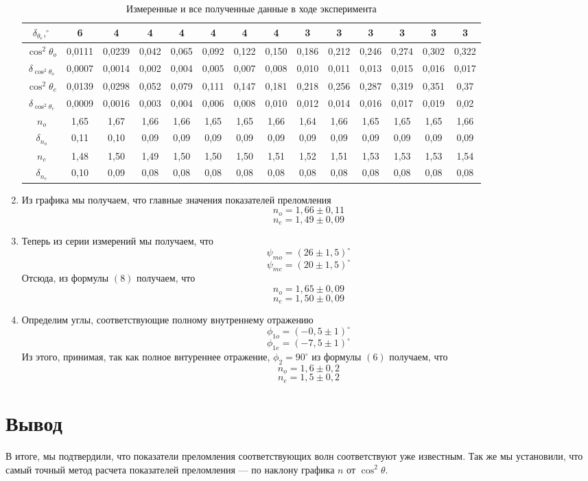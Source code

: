 \documentclass[a4paper, 12pt]{article}%
\begin{document}
\begin{enumerate}
\begin{table}[]
\begin{center}
{\begin{tabular}{|c|c|c|c|c|c|c|c|c|c|c|c|c|c|}
$\delta_{\theta_e}, ^{\circ}$  & 6      & 4      & 4     & 4     & 4     & 4     & 4     & 3     & 3     & 3     & 3     & 3     & 3     \\ \hline
$\cos^2\theta_o$               & 0,0111 & 0,0239 & 0,042 & 0,065 & 0,092 & 0,122 & 0,150 & 0,186 & 0,212 & 0,246 & 0,274 & 0,302 & 0,322 \\ \hline
$\delta_{\cos^2\theta_o}$      & 0,0007 & 0,0014 & 0,002 & 0,004 & 0,005 & 0,007 & 0,008 & 0,010 & 0,011 & 0,013 & 0,015 & 0,016 & 0,017 \\ \hline
$\cos^2\theta_e$               & 0,0139 & 0,0298 & 0,052 & 0,079 & 0,111 & 0,147 & 0,181 & 0,218 & 0,256 & 0,287 & 0,319 & 0,351 & 0,37  \\ \hline
$\delta_{\cos^2\theta_e}$      & 0,0009 & 0,0016 & 0,003 & 0,004 & 0,006 & 0,008 & 0,010 & 0,012 & 0,014 & 0,016 & 0,017 & 0,019 & 0,02  \\ \hline
$n_o$                          & 1,65   & 1,67   & 1,66  & 1,66  & 1,65  & 1,65  & 1,66  & 1,64  & 1,66  & 1,65  & 1,65  & 1,65  & 1,66  \\ \hline
$\delta_{n_o}$                 & 0,11   & 0,10   & 0,09  & 0,09  & 0,09  & 0,09  & 0,09  & 0,09  & 0,09  & 0,09  & 0,09  & 0,09  & 0,09  \\ \hline
$n_e$                          & 1,48   & 1,50   & 1,49  & 1,50  & 1,50  & 1,50  & 1,51  & 1,52  & 1,51  & 1,53  & 1,53  & 1,53  & 1,54  \\ \hline
$\delta_{n_e}$                 & 0,10   & 0,09   & 0,08  & 0,08  & 0,08  & 0,08  & 0,08  & 0,08  & 0,08  & 0,08  & 0,08  & 0,08  & 0,08  \\ \hline
\end{tabular}}
\end{center}
\caption{Измеренные и все полученные данные в ходе эксперимента}
\end{table}
\newpage
\item Из графика мы получаем, что главные значения показателей преломления 
\[n_o = 1,66 \pm 0,11\]
\[n_e = 1,49 \pm 0,09\]
\item Теперь из серии измерений мы получаем, что 
\[\psi_{mo} = (26 \pm 1,5) ^ {\circ}\]
\[\psi_{me} = (20 \pm 1,5) ^ {\circ}\]
Отсюда, из формулы $(8)$ получаем, что 
\[n_o = 1,65 \pm 0,09\]
\[n_e = 1,50 \pm 0,09\]
\item Определим углы, соответствующие полному внутреннему отражению
\[\phi_{1o} = (-0,5 \pm 1) ^{\circ}\]
\[\phi_{1e} = (-7,5 \pm 1) ^{\circ}\]
Из этого, принимая, так как полное внтуреннее отражение, $\phi_2 = 90^{\circ}$ из формулы $(6)$ получаем, что 
\[n_o = 1,6 \pm 0,2\]
\[n_e = 1,5 \pm 0,2\]
\end{enumerate}
\section*{Вывод}
В итоге, мы подтвердили, что показатели преломления соответствующих волн соответствуют уже известным. Так же мы установили, что самый точный метод расчета показателей преломления --- по наклону графика $n$ от $\cos^2\theta$.
\end{document}
